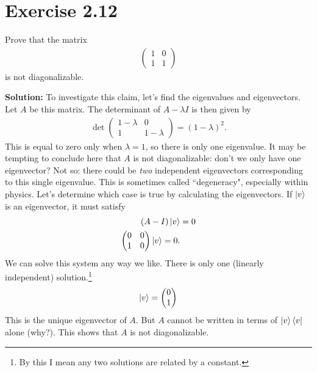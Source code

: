 \documentclass{book}
\begin{document}
\section*{Exercise 2.12}
    Prove that the matrix
    \begin{align}
        \begin{pmatrix}
            1 & 0 \\
            1 & 1
        \end{pmatrix}
    \end{align}
    is not diagonalizable.
    
    \textbf{Solution:} To investigate this claim, let's find the eigenvalues and eigenvectors. Let $A$ be this matrix. The determinant of $A - \lambda I$ is then given by
    \begin{align}
        \det \begin{pmatrix}
            1-\lambda & 0 \\
            1 & 1-\lambda 
        \end{pmatrix} = (1-\lambda)^2.
    \end{align}
    This is equal to zero only when $\lambda = 1$, so there is only one eigenvalue. It may be tempting to conclude here that $A$ is not diagonalizable: don't we only have one eigenvector? Not so: there could be \emph{two} independent eigenvectors corresponding to this single eigenvalue. This is sometimes called ``degeneracy", especially within physics. Let's determine which case is true by calculating the eigenvectors. If $\ket{v}$ is an eigenvector, it must satisfy
    \begin{align}
    \begin{aligned}
        (A-I)\ket{v} &= 0 \\
        \begin{pmatrix}
            0 & 0 \\
            1 & 0
        \end{pmatrix} \ket{v} = 0.
    \end{aligned}
    \end{align}
    We can solve this system any way we like. There is only one (linearly independent) solution.\footnote{By this I mean any two solutions are related by a constant.}
    \begin{align}
        \ket{v} = \begin{pmatrix}
            0 \\
            1
        \end{pmatrix}
    \end{align}
    This is the unique eigenvector of $A$. But $A$ cannot be written in terms of $\ket{v}\bra{v}$ alone (why?). This shows that $A$ is not diagonalizable. 
    
\end{document}
